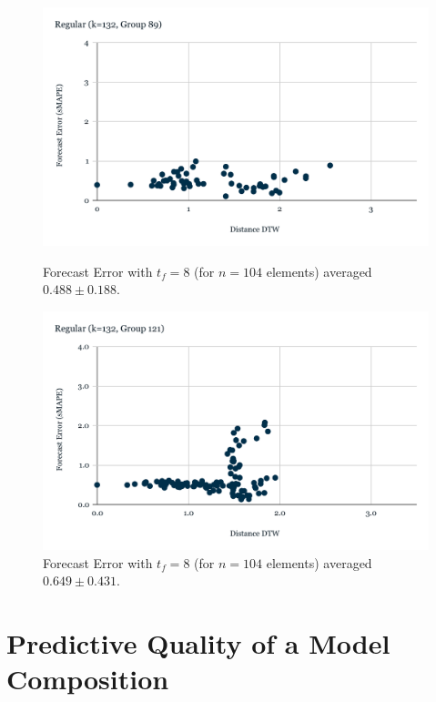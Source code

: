 \begin{figure}[!tbp]
  \centering
  \begin{minipage}[b]{0.45\textwidth}
    \includegraphics[width=\textwidth]{../Figures/distDTW_ForecastError_r132_c89}
    \caption{Forecast Error with $t_{f}=8$ (for $n=104$ elements) averaged $0.488 \pm 0.188$.}
    \label{Fig:DTWsMAPE_r132_c89}
  \end{minipage}
  \hfill
  \begin{minipage}[b]{0.45\textwidth}
    \includegraphics[width=\textwidth]{../Figures/distDTW_ForecastError_r132_c121}
    \caption{Forecast Error with $t_{f}=8$ (for $n=104$ elements) averaged $0.649 \pm 0.431$.}
    \label{Fig:DTWsMAPE_r132_c121}
  \end{minipage}
\end{figure}

\newpage

\section{Predictive Quality of a Model Composition}
\label{Sec:MedoidsModelComposition}

